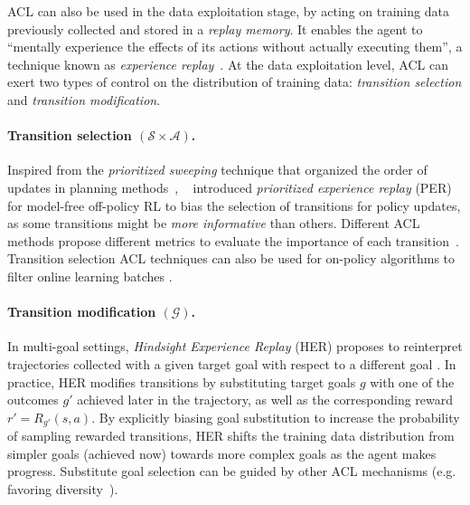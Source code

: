 \documentclass{article}
\newcommand{\mycite}[1]{\citeauthor{#1}~\shortcite{#1}}
\begin{document}
ACL can also be used in the data exploitation stage, by acting on training data previously collected and stored in a \textit{replay memory}. It enables the agent to ``mentally experience the effects of its actions without actually executing them'', a technique known as \textit{experience replay}~\cite{lin1992self}. At the data exploitation level, ACL can exert two types of control on the distribution of training data: \textit{transition selection} and \textit{transition modification}.

\paragraph{Transition selection $(\mathcal{S}\times\mathcal{A})$.}Inspired from the \textit{prioritized sweeping} technique that organized the order of updates in planning methods~\cite{moore1993prioritized}, \mycite{per} introduced \textit{prioritized experience replay} (PER) for model-free off-policy RL to bias the selection of transitions for policy updates, as some transitions might be \textit{more informative} than others. Different ACL methods propose different metrics to evaluate the importance of each transition~\cite{per,eb-per,curious,zhao2019curiosity,le2,imagine}. Transition selection ACL techniques can also be used for on-policy algorithms to filter online learning batches \cite{SAUNA}.

\paragraph{Transition modification $(\mathcal{G})$.}In multi-goal settings, \textit{Hindsight Experience Replay} (HER) proposes to reinterpret trajectories collected with a given target goal with respect to a different goal \cite{her}. In practice, HER modifies transitions by substituting target goals $g$ with one of the outcomes $g'$ achieved later in the trajectory, as well as the corresponding reward $r'=R_{g'}(s,a)$. By explicitly biasing goal substitution to increase the probability of sampling rewarded transitions, HER shifts the training data distribution from simpler goals (achieved now) towards more complex goals as the agent makes progress. Substitute goal selection can be guided by other ACL mechanisms (e.g. favoring diversity~\cite{curriculu-her,cideron2019self}).


\end{document}
